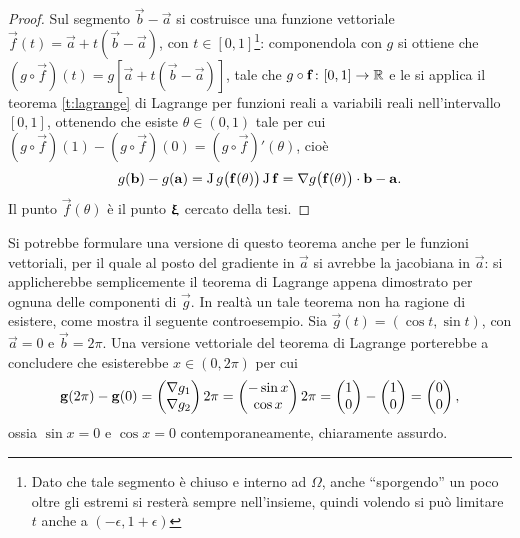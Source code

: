 \begin{proof}
Sul segmento $\vec b-\vec a$ si costruisce una funzione vettoriale $\vec f(t)=\vec a+t(\vec b-\vec a)$, con $t\in[0,1]$\footnote{Dato che tale segmento è chiuso e interno ad $\Omega$, anche ``sporgendo'' un poco oltre gli estremi si resterà sempre nell'insieme, quindi volendo si può limitare $t$ anche a $(-\epsilon,1+\epsilon)$}: componendola con $g$ si ottiene che $(g\circ\vec f)(t)=g[\vec a+t(\vec b-\vec a)]$, tale che $g\circ\mathbf{f}\colon[0,1]\to\mathbb{R}$ e le si applica il teorema \ref{t:lagrange} di Lagrange per funzioni reali a variabili reali nell'intervallo $[0,1]$, ottenendo che esiste $\theta\in(0,1)$ tale per cui $(g\circ\vec f)(1)-(g\circ\vec f)(0)=(g\circ\vec f)'(\theta)$, cioè
\[
g(\mathbf{b})-g(\mathbf{a})=\operatorname{J} g\big(\mathbf{f}(\theta)\big)\operatorname{J}\mathbf{f}={\nabla g\big(\mathbf{f}(\theta)\big)}\cdot{\mathbf{b}-\mathbf{a}}.
\]
Il punto $\vec f(\theta)$ è il punto $\bm{\upxi}$ cercato della tesi.
\end{proof}
Si potrebbe formulare una versione di questo teorema anche per le funzioni vettoriali, per il quale al posto del gradiente in $\vec a$ si avrebbe la jacobiana in $\vec a$: si applicherebbe semplicemente il teorema di Lagrange appena dimostrato per ognuna delle componenti di $\vec g$. In realtà un tale teorema non ha ragione di esistere, come mostra il seguente controesempio. Sia $\vec g(t)=(\cos t,\sin t)$, con $\vec a=0$ e $\vec b=2\pi$. Una versione vettoriale del teorema di Lagrange porterebbe a concludere che esisterebbe $x\in(0,2\pi)$ per cui
\[
\mathbf{g}(2\pi)-\mathbf{g}(0)=\begin{pmatrix}\nabla g_1\\\nabla g_2\end{pmatrix} 2\pi=\begin{pmatrix}-\sin x\\\cos x\end{pmatrix} 2\pi= \begin{pmatrix}1\\0\end{pmatrix}-\begin{pmatrix}1\\0\end{pmatrix}= \begin{pmatrix}0\\0\end{pmatrix},
\]
ossia $\sin x=0$ e $\cos x=0$ contemporaneamente, chiaramente assurdo.

